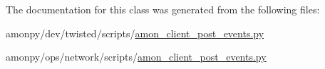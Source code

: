 The documentation for this class was generated from the following files\-:\begin{DoxyCompactItemize}
\item 
amonpy/dev/twisted/scripts/\hyperlink{dev_2twisted_2scripts_2amon__client__post__events_8py}{amon\-\_\-client\-\_\-post\-\_\-events.\-py}\item 
amonpy/ops/network/scripts/\hyperlink{ops_2network_2scripts_2amon__client__post__events_8py}{amon\-\_\-client\-\_\-post\-\_\-events.\-py}\end{DoxyCompactItemize}
